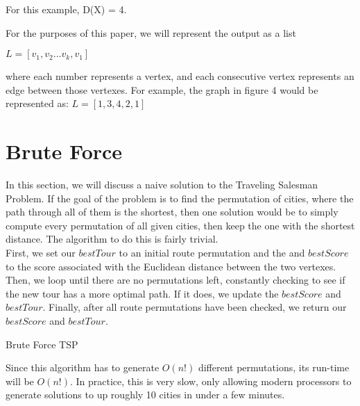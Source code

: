 \documentclass[a4paper,titlepage, margin, 11pt]{article}
\numberwithin{equation}{section}
\begin{document}
For this example, D(X) = 4.


For the purposes of this paper, we will represent the output as a list
\begin{center}
$L = [v_1,v_2 ... v_k,v_1]$
\end{center}
where each number represents a vertex, and each consecutive vertex represents an edge between those vertexes. For example, the graph in figure 4 would be represented as: $L = [1, 3, 4, 2, 1]$



\makeatletter
\def\BState{\State\hskip-\ALG@thistlm}
\makeatother

\section{Brute Force}

In this section, we will discuss a naive solution to the Traveling Salesman Problem. If the goal of the problem is to find the permutation of cities, where the path through all of them is the shortest, then one solution would be to simply compute every permutation of all given cities, then keep the one with the shortest distance. The algorithm to do this is fairly trivial.\\
 First, we set our $bestTour$ to an initial route permutation and the and $bestScore$ to the score associated with the Euclidean distance between the two vertexes. Then, we loop until there are no permutations left, constantly checking to see if the new tour has a more optimal path. If it does, we update the $bestScore$ and $bestTour$. Finally, after all route permutations have been checked, we return our $bestScore$ and $bestTour$.


\begin{algorithm}
\caption{Brute Force TSP}\label{euclid}
\end{algorithm} 

Since this algorithm has to generate $O(n!)$ different permutations, its run-time will be $O(n!)$. In practice, this is very slow, only allowing modern processors to generate solutions to up roughly 10 cities in under a few minutes.\\ 
\end{document}
